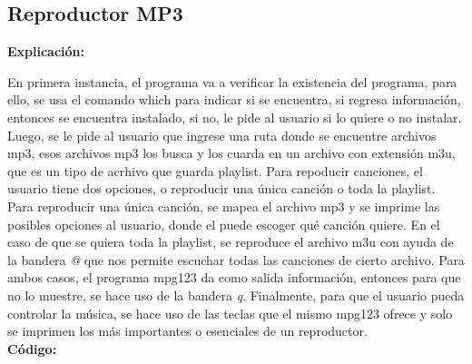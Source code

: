 \documentclass[letter,12pt]{article} %
\begin{document}
\subsection{Reproductor MP3}
\textbf{Explicación:} \par
\vspace{0.3cm}
En primera instancia, el programa va a verificar la existencia del programa, para ello, se usa el comando which para indicar si se encuentra, si regresa información, entonces se encuentra instalado, si no, le pide al usuario si lo quiere o no instalar. Luego, se le pide al usuario que ingrese una ruta donde se encuentre archivos mp3, esos archivos mp3 los busca y los cuarda en un archivo con extensión m3u, que es un tipo de acrhivo que guarda playlist. Para repoducir canciones, el usuario tiene dos opciones, o reproducir una única canción o toda la playlist. Para reproducir una única canción, se mapea el archivo mp3 y se imprime las posibles opciones al usuario, donde el puede escoger qué canción quiere. En el caso de que se quiera toda la playlist, se reproduce el archivo m3u con ayuda de la bandera \textit{@} que nos permite escuchar todas las canciones de cierto archivo. Para ambos casos, el programa mpg123 da como salida información, entonces para que no lo muestre, se hace uso de la bandera \textit{q}. Finalmente, para que el usuario pueda controlar la música, se hace uso de las teclas que el mismo mpg123 ofrece y solo se imprimen los más importantes o esenciales de un reproductor.\\ 
\newpage
\textbf{Código:} \par
\end{document}
